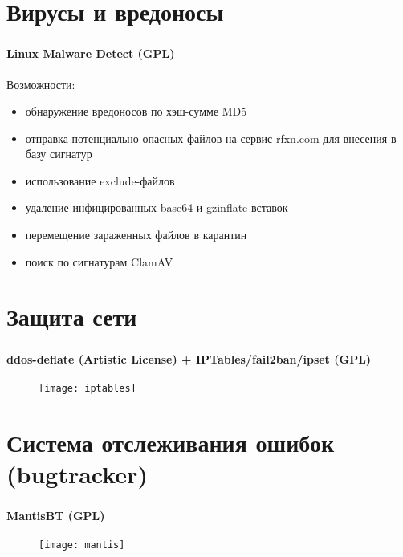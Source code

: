 
\section{Вирусы и вредоносы}

\begin{frame}
\frametitle{\insertsection}
\framesubtitle{Linux Malware Detect (GPL)}
Возможности:
\begin{itemize}
	\item обнаружение вредоносов по хэш-сумме MD5
	\item отправка потенциально опасных файлов на сервис rfxn.com для внесения в базу сигнатур
	\item использование exclude-файлов
	\item удаление инфицированных base64 и gzinflate вставок
	\item перемещение зараженных файлов в карантин
	\item поиск по сигнатурам ClamAV
\end{itemize}
\end{frame}


\section{Защита сети}

\begin{frame}
\frametitle{\insertsection}
\framesubtitle{ddos-deflate (Artistic License) + IPTables/fail2ban/ipset (GPL)}
\begin{figure}[h]
	\begin{center}
		\texttt{[image: iptables]}
	\end{center}
\end{figure}
\end{frame}


\section{Система отслеживания ошибок (bugtracker)}

\begin{frame}
\frametitle{\insertsection}
\framesubtitle{MantisBT (GPL)}
\begin{figure}[h]
	\begin{center}
		\texttt{[image: mantis]}
	\end{center}
\end{figure}
\end{frame}

